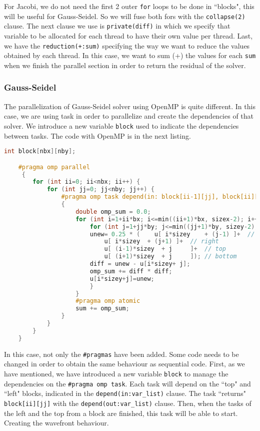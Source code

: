 \documentclass[a4paper, 10pt]{article}
\begin{document}
  For Jacobi, we do not need the first 2 outer \texttt{for} loops to be done in ``blocks", this will be useful for Gauss-Seidel. So we will fuse both fors with the \texttt{collapse(2)} clause. The next clause we use is \texttt{private(diff)} in which we specify that variable to be allocated for each thread to have their own value per thread. Last, we have the \texttt{reduction(+:sum)} specifying the way we want to reduce the values obtained by each thread. In this case, we want to sum (+) the values for each \texttt{sum} when we finish the parallel section in order to return the residual of the solver.

\clearpage
  \subsubsection{Gauss-Seidel}

  The parallelization of Gauss-Seidel solver using OpenMP is quite different. In this case, we are using task in order to parallelize and create the dependencies of that solver. We introduce a new variable \texttt{block} used to indicate the dependencies between tasks. The code with OpenMP is in the next listing.

\begin{lstlisting}[language=c, caption={OpenMP pragma for Gauss-Seidel parallelization}]
    int block[nbx][nby];

    #pragma omp parallel
     {
        for (int ii=0; ii<nbx; ii++) {
            for (int jj=0; jj<nby; jj++) {
                #pragma omp task depend(in: block[ii-1][jj], block[ii][jj-1]) depend(out: block[ii][jj]) private(diff, unew) 
                {
                    double omp_sum = 0.0;
                    for (int i=1+ii*bx; i<=min((ii+1)*bx, sizex-2); i++) {
                        for (int j=1+jj*by; j<=min((jj+1)*by, sizey-2); j++) {
                        unew= 0.25 * (    u[ i*sizey	+ (j-1) ]+  // left
                            u[ i*sizey	+ (j+1) ]+  // right
                            u[ (i-1)*sizey	+ j     ]+  // top
                            u[ (i+1)*sizey	+ j     ]); // bottom
                        diff = unew - u[i*sizey+ j];
                        omp_sum += diff * diff; 
                        u[i*sizey+j]=unew;
                        } 
                    }
                    #pragma omp atomic
                    sum += omp_sum;
                }
            }
        }
    }\end{lstlisting}

  In this case, not only the \texttt{\#pragmas} have been added. Some code needs to be changed in order to obtain the same behaviour as sequential code. First, as we have mentioned, we have introduced a new variable \texttt{block} to manage the dependencies on the \texttt{\#pragma omp task}. Each task will depend on the ``top" and ``left" blocks, indicated in the \texttt{depend(in:var\_list)} clause. The task ``returns" \texttt{block[ii][jj]} with the \texttt{depend(out:var\_list)} clause. Then, when the tasks of the left and the top from a block are finished, this task will be able to start. Creating the wavefront behaviour.
\end{document}
